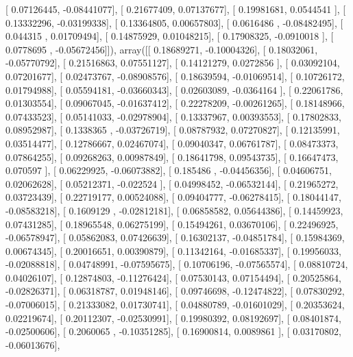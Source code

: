 \documentclass{article}
\begin{document}
       [ 0.07126445, -0.08441077],
       [ 0.21677409,  0.07137677],
       [ 0.19981681,  0.0544541 ],
       [ 0.13332296, -0.03199338],
       [ 0.13364805,  0.00657803],
       [ 0.0616486 , -0.08482495],
       [ 0.044315  ,  0.01709494],
       [ 0.14875929,  0.01048215],
       [ 0.17908325, -0.0910018 ],
       [ 0.0778695 , -0.05672456]]), array([[ 0.18689271, -0.10004326],
       [ 0.18032061, -0.05770792],
       [ 0.21516863,  0.07551127],
       [ 0.14121279,  0.0272856 ],
       [ 0.03092104,  0.07201677],
       [ 0.02473767, -0.08908576],
       [ 0.18639594, -0.01069514],
       [ 0.10726172,  0.01794988],
       [ 0.05594181, -0.03660343],
       [ 0.02603089, -0.0364164 ],
       [ 0.22061786,  0.01303554],
       [ 0.09067045, -0.01637412],
       [ 0.22278209, -0.00261265],
       [ 0.18148966,  0.07433523],
       [ 0.05141033, -0.02978904],
       [ 0.13337967,  0.00393553],
       [ 0.17802833,  0.08952987],
       [ 0.1338365 , -0.03726719],
       [ 0.08787932,  0.07270827],
       [ 0.12135991,  0.03514477],
       [ 0.12786667,  0.02467074],
       [ 0.09040347,  0.06761787],
       [ 0.08473373,  0.07864255],
       [ 0.09268263,  0.00987849],
       [ 0.18641798,  0.09543735],
       [ 0.16647473,  0.070597  ],
       [ 0.06229925, -0.06073882],
       [ 0.185486  , -0.04456356],
       [ 0.04606751,  0.02062628],
       [ 0.05212371, -0.022524  ],
       [ 0.04998452, -0.06532144],
       [ 0.21965272,  0.03723439],
       [ 0.22719177,  0.00524088],
       [ 0.09404777, -0.06278415],
       [ 0.18044147, -0.08583218],
       [ 0.1609129 , -0.02812181],
       [ 0.06858582,  0.05644386],
       [ 0.14459923,  0.07431285],
       [ 0.18965548,  0.06275199],
       [ 0.15494261,  0.03670106],
       [ 0.22496925, -0.06578947],
       [ 0.05862083,  0.07426639],
       [ 0.16302137, -0.04851784],
       [ 0.15984369,  0.00674345],
       [ 0.20016651,  0.00390879],
       [ 0.11342164, -0.01685337],
       [ 0.19956033, -0.02088818],
       [ 0.04748991, -0.07595675],
       [ 0.10706196, -0.07565574],
       [ 0.08810724,  0.04026107],
       [ 0.12874803, -0.11276424],
       [ 0.07530143,  0.07154494],
       [ 0.20525864, -0.02826371],
       [ 0.06318787,  0.01948146],
       [ 0.09746698, -0.12474822],
       [ 0.07830292, -0.07006015],
       [ 0.21333082,  0.01730741],
       [ 0.04880789, -0.01601029],
       [ 0.20353624,  0.02219674],
       [ 0.20112307, -0.02530991],
       [ 0.19980392,  0.08192697],
       [ 0.08401874, -0.02500606],
       [ 0.2060065 , -0.10351285],
       [ 0.16900814,  0.0089861 ],
       [ 0.03170802, -0.06013676],
\end{document}
